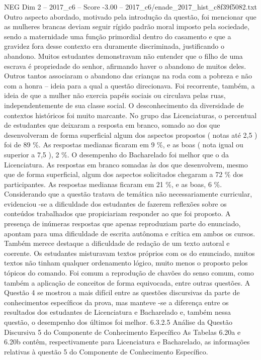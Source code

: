 \begin{textsample}{NEG Dim 2 – 2017\_c6 – Score -3.00 – 2017\_c6/enade\_2017\_hist\_c8f39f5082.txt}
Outro aspecto abordado, motivado pela introdução da questão, foi mencionar que as mulheres brancas deviam seguir rígido padrão moral imposto pela sociedade, sendo a maternidade uma função primordial dentro do casamento e que a gravidez fora desse contexto era duramente discriminada, justificando o abandono.
Muitos estudantes demonstravam não entender que o filho de uma escrava é propriedade do senhor, afirmando haver o abandono de muitos deles.
Outros tantos associaram o abandono das crianças na roda com a pobreza e não com a honra – ideia para a qual a questão direcionava.
Foi recorrente, também, a ideia de que a mulher não exercia papéis sociais ou circulava pelas ruas, independentemente de sua classe social.
O desconhecimento da diversidade de contextos históricos foi muito marcante.
No grupo das Licenciaturas, o percentual de estudantes que deixaram a resposta em branco, somado ao dos que desenvolveram de forma superficial algum dos aspectos propostos ( notas até 2,5 ) foi de 89 \%.
As respostas medianas ficaram em 9 \%, e as boas ( nota igual ou superior a 7,5 ), 2 \%.
O desempenho do Bacharelado foi melhor que o da Licenciatura.
As respostas em branco somadas às dos que desenvolvem, mesmo que de forma superficial, algum dos aspectos solicitados chegaram a 72 \% dos participantes.
As respostas medianas ficaram em 21 \%, e as boas, 6 \%.
Considerando que a questão tratava de temática não necessariamente curricular, evidenciou -se a dificuldade dos estudantes de fazerem reflexões sobre os conteúdos trabalhados que propiciariam responder ao que foi proposto.
A presença de inúmeras respostas que apenas reproduziam parte do enunciado, apontam para uma dificuldade de escrita autônoma e crítica em ambos os cursos.
Também merece destaque a dificuldade de redação de um texto autoral e coerente.
Os estudantes misturavam textos próprios com os do enunciado, muitos textos não tinham qualquer ordenamento lógico, muito menos o proposto pelos tópicos do comando.
Foi comum a reprodução de chavões do senso comum, como também a aplicação de conceitos de forma equivocada, entre outras questões.
A Questão 4 se mostrou a mais difícil entre as questões discursivas da parte de conhecimentos específicos da prova, mas manteve -se a diferença entre os resultados dos estudantes de Licenciatura e Bacharelado e, também nessa questão, o desempenho dos últimos foi melhor. 6.3.2.5 Análise da Questão Discursiva 5 do Componente de Conhecimento Específico As Tabelas 6.20a e 6.20b contêm, respectivamente para Licenciatura e Bacharelado, as informações relativas à questão 5 do Componente de Conhecimento Específico.

\end{textsample}
